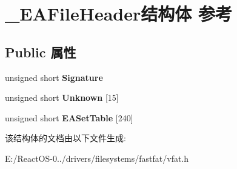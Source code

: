 \hypertarget{struct___e_a_file_header}{}\section{\+\_\+\+E\+A\+File\+Header结构体 参考}
\label{struct___e_a_file_header}
\subsection*{Public 属性}
\begin{DoxyCompactItemize}
\item 
\mbox{\label{struct___e_a_file_header_a705d0873ed2329f239558330d6be5a8a}} 
unsigned short {\bfseries Signature}
\item 
\mbox{\label{struct___e_a_file_header_aec125bc536e1475bd2136f551a8249c3}} 
unsigned short {\bfseries Unknown} \mbox{[}15\mbox{]}
\item 
\mbox{\label{struct___e_a_file_header_a404d74801260c23d9106d3426a953e1b}} 
unsigned short {\bfseries E\+A\+Set\+Table} \mbox{[}240\mbox{]}
\end{DoxyCompactItemize}


该结构体的文档由以下文件生成\+:\begin{DoxyCompactItemize}
\item 
E\+:/\+React\+O\+S-\/0../drivers/filesystems/fastfat/vfat.\+h\end{DoxyCompactItemize}
